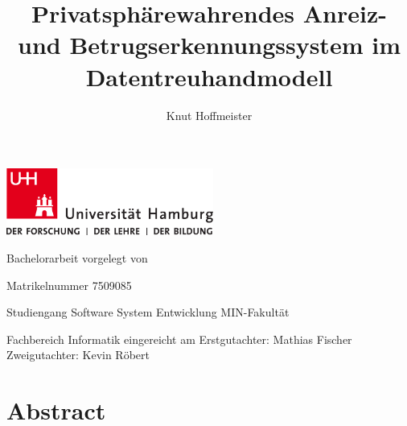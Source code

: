\documentclass[
	fontsize=12pt,
	headings=small,
	parskip=half,           %
	bibliography=totoc,
	numbers=noenddot,       %
	open=any,               %
]{scrreprt}
\begin{document}
\title{Privatsphärewahrendes Anreiz- und Betrugserkennungssystem im\\ Datentreuhandmodell}
\author{Knut Hoffmeister}

\begin{titlepage}
\includegraphics[width=6.8cm]{up-uhh-logo-u-2010-u-farbe-u-rgb.pdf}
\begin{center}
    \vfill
    \Large Bachelorarbeit
    \vfill
    \makeatletter
    {\Large\textsf{\textbf{\@title}}}
    \makeatother
    \vfill
    vorgelegt von
    \par\bigskip
    \makeatletter
    {\@author}
    \makeatother
    \par
    Matrikelnummer 7509085 \par
    Studiengang Software System Entwicklung
    \vfill
    MIN-Fakultät \par
    Fachbereich Informatik
    \vfill
    \makeatletter
    eingereicht am {\@date}
    \makeatother
    \vfill
    Erstgutachter: Mathias Fischer\\
    Zweigutachter: Kevin Röbert
\end{center}
\end{titlepage}

\restoregeometry

\tableofcontents


\chapter*{Abstract}


\end{document}
